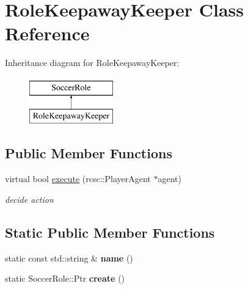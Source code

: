 \hypertarget{classRoleKeepawayKeeper}{
\section{RoleKeepawayKeeper Class Reference}
\label{classRoleKeepawayKeeper}
}
Inheritance diagram for RoleKeepawayKeeper:\begin{figure}[H]
\begin{center}
\leavevmode
\includegraphics[height=2.000000cm]{classRoleKeepawayKeeper}
\end{center}
\end{figure}
\subsection*{Public Member Functions}
\begin{DoxyCompactItemize}
\item 
\hypertarget{classRoleKeepawayKeeper_ad745188e88106d7768280b7091885cf3}{
virtual bool \hyperlink{classRoleKeepawayKeeper_ad745188e88106d7768280b7091885cf3}{execute} (rcsc::PlayerAgent $\ast$agent)}
\label{classRoleKeepawayKeeper_ad745188e88106d7768280b7091885cf3}

\begin{DoxyCompactList}\small\item\em decide action \item\end{DoxyCompactList}\end{DoxyCompactItemize}
\subsection*{Static Public Member Functions}
\begin{DoxyCompactItemize}
\item 
\hypertarget{classRoleKeepawayKeeper_a007adb7edf9d83ea90e9b843b2a491c2}{
static const std::string \& {\bfseries name} ()}
\label{classRoleKeepawayKeeper_a007adb7edf9d83ea90e9b843b2a491c2}

\item 
\hypertarget{classRoleKeepawayKeeper_a66d04fa29259c1f874846c0a93e13227}{
static SoccerRole::Ptr {\bfseries create} ()}
\label{classRoleKeepawayKeeper_a66d04fa29259c1f874846c0a93e13227}

\end{DoxyCompactItemize}
